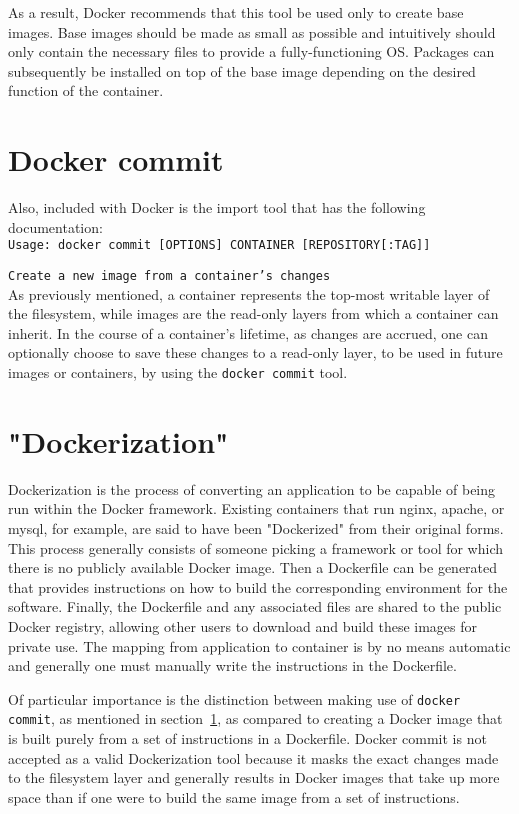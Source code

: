 As a result, Docker recommends that this tool be used only to create base images. Base images should be made as small as possible and intuitively should only contain the necessary files to provide a fully-functioning OS. Packages can subsequently be installed on top of the base image depending on the desired function of the container. 

\section{Docker commit}
\label{sec:dockercommit}
Also, included with Docker is the import tool that has the following documentation:\\

\texttt{Usage: docker commit [OPTIONS] CONTAINER [REPOSITORY[:TAG]]}

\texttt{Create a new image from a container's changes} \\

As previously mentioned, a container represents the top-most writable layer of the filesystem, while images are the read-only layers from which a container can inherit. In the course of a container's lifetime, as changes are accrued, one can optionally choose to save these changes to a read-only layer, to be used in future images or containers, by using the \texttt{docker commit} tool.

\section{"Dockerization"}
\label{sec:dockerize}
Dockerization is the process of converting an application to be capable of being run within the Docker framework. Existing containers that run nginx, apache, or mysql, for example, are said to have been "Dockerized" from their original forms. This process generally consists of someone picking a framework or tool for which there is no publicly available Docker image. Then a Dockerfile can be generated that provides instructions on how to build the corresponding environment for the software. Finally, the Dockerfile and any associated files are shared to the public Docker registry, allowing other users to download and build these images for private use. The mapping from application to container is by no means automatic and generally one must manually write the instructions in the Dockerfile. 

Of particular importance is the distinction between making use of \texttt{docker commit}, as mentioned in section~\ref{sec:dockercommit}, as compared to creating a Docker image that is built purely from a set of instructions in a Dockerfile. Docker commit is not accepted as a valid Dockerization tool because it masks the exact changes made to the filesystem layer and generally results in Docker images that take up more space than if one were to build the same image from a set of instructions. 

